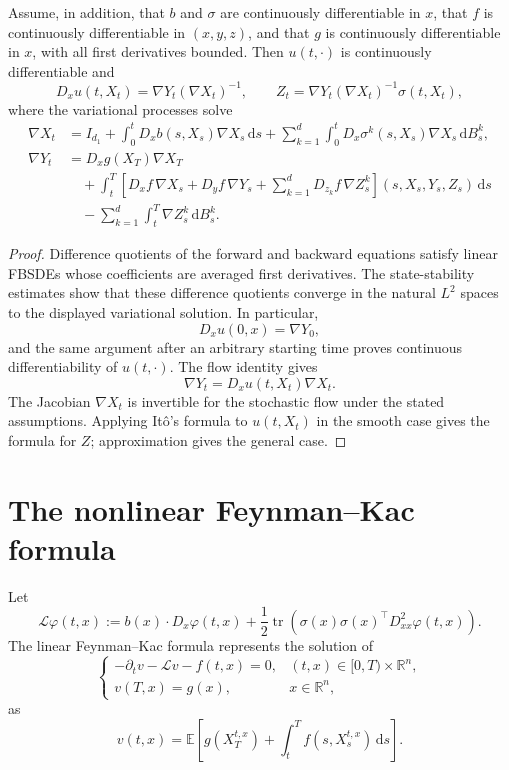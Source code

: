 \begin{lem}
Assume, in addition, that $b$ and $\sigma$ are continuously
differentiable in $x$, that $f$ is continuously differentiable in
$(x,y,z)$, and that $g$ is continuously differentiable in $x$, with all
first derivatives bounded.  Then $u(t,\cdot)$ is continuously
differentiable and
\[
  D_xu(t,X_t)=\nabla Y_t(\nabla X_t)^{-1},
  \qquad
  Z_t=\nabla Y_t(\nabla X_t)^{-1}\sigma(t,X_t),
\]
where the variational processes solve
\[
\begin{aligned}
  \nabla X_t
  &=I_{d_1}
    +\int_0^t D_xb(s,X_s)\nabla X_s\,\mathrm ds
    +\sum_{k=1}^d\int_0^t D_x\sigma^k(s,X_s)\nabla X_s\,\mathrm dB_s^k,\\
  \nabla Y_t
  &=D_xg(X_T)\nabla X_T\\
  &\quad+\int_t^T\left[
    D_xf\,\nabla X_s+D_yf\,\nabla Y_s
    +\sum_{k=1}^dD_{z_k}f\,\nabla Z_s^k
  \right](s,X_s,Y_s,Z_s)\,\mathrm ds\\
  &\quad-\sum_{k=1}^d\int_t^T\nabla Z_s^k\,\mathrm dB_s^k.
\end{aligned}
\]
\end{lem}

\begin{proof}
Difference quotients of the forward and backward equations satisfy
linear FBSDEs whose coefficients are averaged first derivatives.  The
state-stability estimates show that these difference quotients converge
in the natural $L^2$ spaces to the displayed variational solution.  In
particular,
\[
  D_xu(0,x)=\nabla Y_0,
\]
and the same argument after an arbitrary starting time proves
continuous differentiability of $u(t,\cdot)$.  The flow identity gives
\[
  \nabla Y_t=D_xu(t,X_t)\nabla X_t.
\]
The Jacobian $\nabla X_t$ is invertible for the stochastic flow under the
stated assumptions.  Applying It\^o's formula to $u(t,X_t)$ in the
smooth case gives the formula for $Z$; approximation gives the general
case.
\end{proof}

\section{The nonlinear Feynman--Kac formula}

Let
\[
  \mathcal L\varphi(t,x)
  :=b(x)\cdot D_x\varphi(t,x)
    +\frac12\operatorname{tr}\!\left(
      \sigma(x)\sigma(x)^\top D_{xx}^2\varphi(t,x)
    \right).
\]
The linear Feynman--Kac formula represents the solution of
\[
\begin{cases}
  -\partial_tv-\mathcal Lv-f(t,x)=0,
    &(t,x)\in[0,T)\times\mathbb R^n,\\
  v(T,x)=g(x),&x\in\mathbb R^n,
\end{cases}
\]
as
\[
  v(t,x)=\mathbb E\!\left[
    g(X_T^{t,x})+\int_t^T f(s,X_s^{t,x})\,\mathrm ds
  \right].
\]

